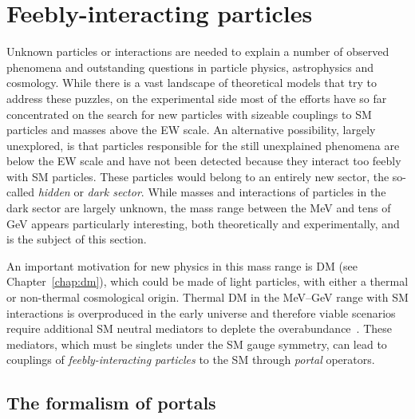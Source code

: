 \documentclass[../report.tex]{subfiles}
\begin{document}

\section{Feebly-interacting particles}
\label{sec:BSM-FIPs}

Unknown particles or interactions are needed to explain a number of observed phenomena and outstanding questions in particle physics, astrophysics and cosmology. While there is a vast landscape of theoretical models that try to address these puzzles, on the experimental side most of the efforts have so far concentrated on the search for new particles with sizeable couplings to SM particles and masses above the EW scale.
An alternative possibility, largely unexplored, is that particles responsible for the still unexplained phenomena are below the EW scale and have not been detected because they interact too feebly with SM particles. 
These particles would belong to an entirely new sector, the so-called {\it hidden} or {\it dark sector}. While masses and interactions of particles in the dark sector are largely unknown, the mass range between the MeV and tens of GeV appears particularly interesting, both theoretically and experimentally, and is the subject of this section.

An important motivation for new physics in this mass range is DM (see Chapter~\ref{chap:dm}), which could be made of light particles, with either a thermal or non-thermal cosmological origin. Thermal DM in the MeV--GeV range with SM interactions is overproduced in the early universe and therefore viable scenarios require additional SM neutral mediators to deplete the overabundance~\cite{Lee:1977ua,Boehm:2002yz,Boehm:2003hm,Pospelov:2007mp,Feng:2008ya,ArkaniHamed:2008qn}. 
These mediators, which must be singlets under the SM
gauge symmetry, can lead to couplings of {\it feebly-interacting particles} to the SM through {\it portal} operators.

\subsection{The formalism of portals }
\label{ssec:fips_portals}
\end{document}
